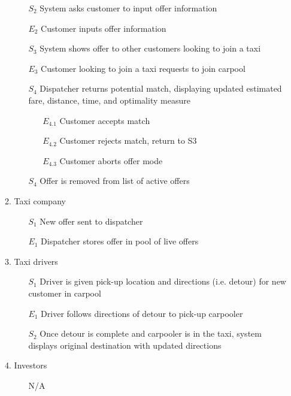 \documentclass[]{article}
\begin{document}
\begin{enumerate}[{\textbf{BE}}1.]
\begin{enumerate}[{VP4}.1]
\begin{enumerate}
                \item[$S_2$] System asks customer to input offer information
                \item[$E_2$] Customer inputs offer information
                \item[$S_3$] System shows offer to other customers looking to join a taxi
                \item[$E_3$] Customer looking to join a taxi requests to join carpool
                \item[$S_4$] Dispatcher returns potential match, displaying updated estimated fare, distance, time, and optimality measure
                \begin{enumerate}
                    \item[$E_{4.1}$] Customer accepts match
                    \item[$E_{4.2}$] Customer rejects match, return to S3
                    \item[$E_{4.3}$] Customer aborts offer mode
                \end{enumerate}
                \item[$S_4$] Offer is removed from list of active offers
            \end{enumerate}
        \item Taxi company
            \begin{enumerate}
                \item[$S_1$] New offer sent to dispatcher
                \item[$E_1$] Dispatcher stores offer in pool of live offers
            \end{enumerate}
        \item Taxi drivers
            \begin{enumerate}
                \item[$S_1$] Driver is given pick-up location and directions (i.e. detour) for new customer in carpool
                \item[$E_1$] Driver follows directions of detour to pick-up carpooler
                \item[$S_2$] Once detour is complete and carpooler is in the taxi, system displays original destination with updated directions
            \end{enumerate}
        \item Investors
            \begin{enumerate}
                \item[N/A]
            \end{enumerate}

\end{enumerate}
\end{enumerate}
\end{document}
